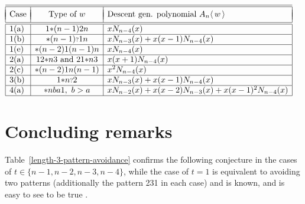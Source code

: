 \documentclass[11pt]{article}
\newcommand{\exactly}[2]{\ensuremath{\mathcal{E}_{#1,#2}}}
\newcommand{\st}{\mbox{\ensuremath{\ast}}}
\newcommand{\q}{\mbox{\ensuremath{\scriptstyle{?}}}}
\newcommand{\+}{\mbox{\ensuremath{\scriptstyle{+}}}}
\newcommand{\glob}[1]{\ensuremath{\langle\, #1\,\rangle}}
\begin{document}
\begin{table}[h!]
	$\begin{array}{|l|c|l|} \hline\hline
			            &                                &                                                            \\[-2ex]
			\mbox{Case} & \mbox{Type of } w              & \mbox{Descent gen. polynomial }  A_n \glob{w}              \\[-2ex]
			            &                                &                                                            \\\hline\hline
			\mbox{1(a)} & 1\st (n-1)2n                   & xN_{n-4}(x)                                                \\  \hline
			\mbox{1(b)} & \st(n-1)\q1n                   & xN_{n-3}(x) + x(x-1)N_{n-4}(x)                             \\  \hline
			\mbox{1(e)} & \st (n-2)1(n-1)n               & xN_{n-4}(x)                                                \\  \hline
			\mbox{2(a)} & 12\st n3 \mbox{ and } 21\st n3 & x(x+1)N_{n-4}(x)                                           \\  \hline
			\mbox{2(c)} & \st(n-2)1n(n-1)                & x^2N_{n-4}(x)                                              \\  \hline
			\mbox{3(b)} & 1\st n\q 2                     & xN_{n-3}(x) + x(x-1)N_{n-4}(x)                             \\  \hline
			\mbox{4(a)} & \st nba1,\ b>a                 & x  N_{n-2}(x) + x (x-2) N_{n-3}(x) +  x (x-1)^2 N_{n-4}(x) \\  \hline
		\end{array}$\bigskip
	\caption{Permutations in $\exactly{n}{n-3}^{312}$ for {$n\geq5$}}\label{thelist-312}
\end{table}


\section{Concluding remarks}\label{final-sect}

Table~\ref{length-3-pattern-avoidance} confirms the following conjecture in the cases of $t\in\{n-1,n-2,n-3,n-4\}$, while the case of $t=1$ is equivalent to avoiding two patterns (additionally the pattern 231 in each case) and is known, and is easy to see to be true \cite{Kitaev2011Patterns}.
\end{document}
